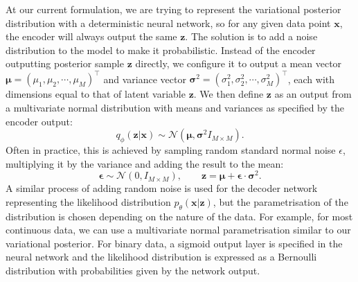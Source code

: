 \documentclass[honours,12pt]{unswthesis}
\numberwithin{equation}{section}
\theoremstyle{definition}
\begin{document}
At our current formulation, we are trying to represent the variational posterior distribution with a deterministic neural network, so for any given data point $\bm{x}$, the encoder will always output the same $\bm{z}$. The solution is to add a noise distribution to the model to make it probabilistic. Instead of the encoder outputting posterior sample $\bm{z}$ directly, we configure it to output a mean vector $\bm{\mu}=(\mu_1,\mu_2,\cdots,\mu_M)^\top$ and variance vector $\bm{\sigma}^2=(\sigma^2_1,\sigma^2_2,\cdots, \sigma^2_M)^\top$, each with dimensions equal to that of latent variable $\bm{z}$. We then define $\bm{z}$ as an output from a multivariate normal distribution with means and variances as specified by the encoder output:
\[q_\phi(\bm{z}|\bm{x})\sim \mathcal{N}(\bm{\mu},\bm{\sigma}^2I_{M\times M}).\]
Often in practice, this is achieved by sampling random standard normal noise $\epsilon$, multiplying it by the variance and adding the result to the mean:
\[\bm{\epsilon}\sim \mathcal{N}(0,I_{M\times M}),\qquad \bm{z}=\bm{\mu}+\bm{\epsilon}\cdot\bm{\sigma}^2.\]
A similar process of adding random noise is used for the decoder network representing the likelihood distribution $p_\theta(\bm{x}|\bm{z})$, but the parametrisation of the distribution is chosen depending on the nature of the data. For example, for most continuous data, we can use a multivariate normal parametrisation similar to our variational posterior. For binary data, a sigmoid output layer is specified in the neural network and the likelihood distribution is expressed as a Bernoulli distribution with probabilities given by the network output.
\end{document}
